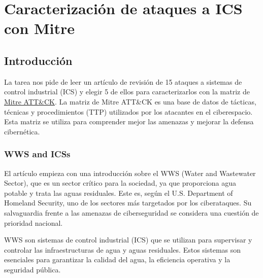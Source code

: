 \chapter{Caracterización de ataques a ICS con Mitre}
\label{chap:01}
\section{Introducción}

La tarea nos pide de leer un artículo de revisión de 15 ataques a sistemas de control industrial (ICS) y elegir 5 de ellos para caracterizarlos con la matriz de \href{attack.mitre.org/matrices/ics/}{Mitre ATT\&CK}. La matriz de Mitre ATT\&CK es una base de datos de tácticas, técnicas y procedimientos (TTP) utilizados por los atacantes en el ciberespacio. Esta matriz se utiliza para comprender mejor las amenazas y mejorar la defensa cibernética.


\subsection{WWS and ICSs}

El artículo empieza con una introducción sobre el WWS (Water and Wastewater Sector), que es un sector crítico para la sociedad, ya que proporciona agua potable y trata las aguas residuales. 
Este es, según el U.S. Department of Homeland Security, uno de los sectores más targetados por los ciberataques. Su salvaguardia frente a las amenazas de ciberseguridad se considera una cuestión de prioridad nacional.

WWS son sistemas de control industrial (ICS) que se utilizan para supervisar y controlar las infraestructuras de agua y aguas residuales. Estos sistemas son esenciales para garantizar la calidad del agua, la eficiencia operativa y la seguridad pública.

